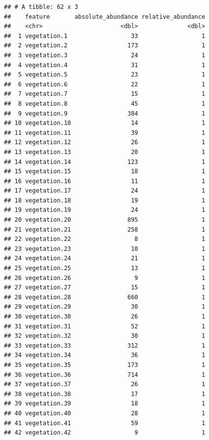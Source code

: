 \documentclass[12pt,]{book}
\begin{document}
\begin{verbatim}
## # A tibble: 62 x 3
##    feature       absolute_abundance relative_abundance
##    <chr>                      <dbl>              <dbl>
##  1 vegetation.1                  33                  1
##  2 vegetation.2                 173                  1
##  3 vegetation.3                  24                  1
##  4 vegetation.4                  31                  1
##  5 vegetation.5                  23                  1
##  6 vegetation.6                  22                  1
##  7 vegetation.7                  15                  1
##  8 vegetation.8                  45                  1
##  9 vegetation.9                 384                  1
## 10 vegetation.10                 14                  1
## 11 vegetation.11                 39                  1
## 12 vegetation.12                 26                  1
## 13 vegetation.13                 20                  1
## 14 vegetation.14                123                  1
## 15 vegetation.15                 18                  1
## 16 vegetation.16                 11                  1
## 17 vegetation.17                 24                  1
## 18 vegetation.18                 19                  1
## 19 vegetation.19                 24                  1
## 20 vegetation.20                895                  1
## 21 vegetation.21                258                  1
## 22 vegetation.22                  8                  1
## 23 vegetation.23                 10                  1
## 24 vegetation.24                 21                  1
## 25 vegetation.25                 13                  1
## 26 vegetation.26                  9                  1
## 27 vegetation.27                 15                  1
## 28 vegetation.28                660                  1
## 29 vegetation.29                 30                  1
## 30 vegetation.30                 26                  1
## 31 vegetation.31                 52                  1
## 32 vegetation.32                 30                  1
## 33 vegetation.33                312                  1
## 34 vegetation.34                 36                  1
## 35 vegetation.35                173                  1
## 36 vegetation.36                714                  1
## 37 vegetation.37                 26                  1
## 38 vegetation.38                 17                  1
## 39 vegetation.39                 18                  1
## 40 vegetation.40                 28                  1
## 41 vegetation.41                 59                  1
## 42 vegetation.42                  9                  1

\end{verbatim}
\end{document}
